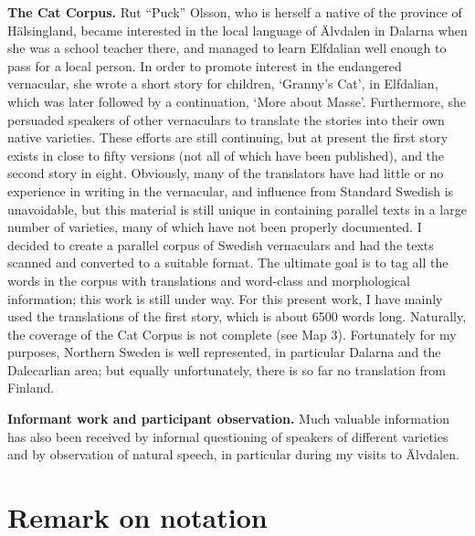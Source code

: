
\textbf{The Cat Corpus. }Rut “Puck” Olsson, who is herself a native of the province of Hälsingland, became interested in the local language of Älvdalen in Dalarna when she was a school teacher there, and managed to learn Elfdalian well enough to pass for a local person. In order to promote interest in the endangered vernacular, she wrote a short story for children,  ‘Granny’s Cat’, in Elfdalian, which was later followed by a continuation,  ‘More about Masse’. Furthermore, she persuaded speakers of other vernaculars to translate the stories into their own native varieties. These efforts are still continuing, but at present the first story exists in close to fifty versions (not all of which have been published), and the second story in eight. Obviously, many of the translators have had little or no experience in writing in the vernacular, and influence from Standard Swedish is unavoidable, but this material is still unique in containing parallel texts in a large number of varieties, many of which have not been properly documented. I decided to create a parallel corpus of Swedish vernaculars and had the texts scanned and converted to a suitable format. The ultimate goal is to tag all the words in the corpus with translations and word-class and morphological information; this work is still under way. For this present work, I have mainly used the translations of the first story, which is about 6500 words long. Naturally, the coverage of the Cat Corpus is not complete (see Map 3). Fortunately for my purposes, Northern Sweden is well represented, in particular Dalarna and the Dalecarlian area; but equally unfortunately, there is so far no translation from Finland. 


\textbf{Informant work and participant observation. }Much\textbf{ }valuable information has also been received by informal questioning of speakers of different varieties and by observation of natural speech, in particular during my visits to Älvdalen. 


\section{Remark on notation}

